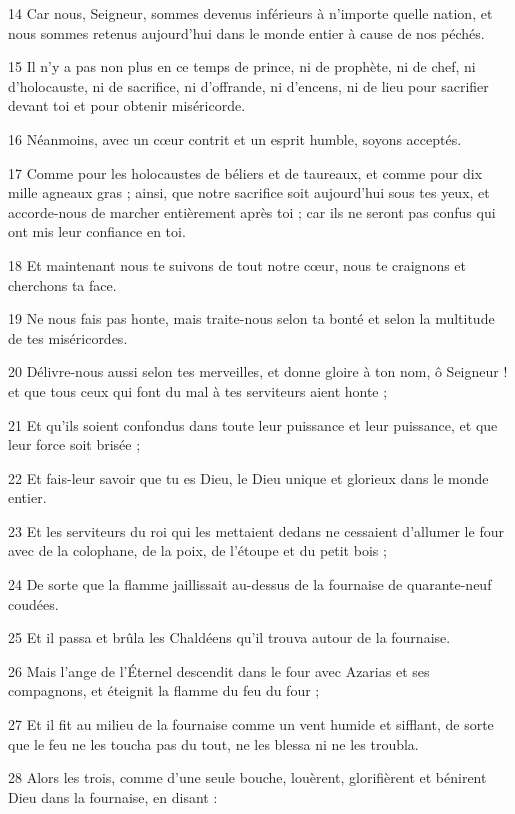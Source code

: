 \par 14 Car nous, Seigneur, sommes devenus inférieurs à n'importe quelle nation, et nous sommes retenus aujourd'hui dans le monde entier à cause de nos péchés.
\par 15 Il n'y a pas non plus en ce temps de prince, ni de prophète, ni de chef, ni d'holocauste, ni de sacrifice, ni d'offrande, ni d'encens, ni de lieu pour sacrifier devant toi et pour obtenir miséricorde.
\par 16 Néanmoins, avec un cœur contrit et un esprit humble, soyons acceptés.
\par 17 Comme pour les holocaustes de béliers et de taureaux, et comme pour dix mille agneaux gras ; ainsi, que notre sacrifice soit aujourd'hui sous tes yeux, et accorde-nous de marcher entièrement après toi ; car ils ne seront pas confus qui ont mis leur confiance en toi.
\par 18 Et maintenant nous te suivons de tout notre cœur, nous te craignons et cherchons ta face.
\par 19 Ne nous fais pas honte, mais traite-nous selon ta bonté et selon la multitude de tes miséricordes.
\par 20 Délivre-nous aussi selon tes merveilles, et donne gloire à ton nom, ô Seigneur ! et que tous ceux qui font du mal à tes serviteurs aient honte ;
\par 21 Et qu'ils soient confondus dans toute leur puissance et leur puissance, et que leur force soit brisée ;
\par 22 Et fais-leur savoir que tu es Dieu, le Dieu unique et glorieux dans le monde entier.
\par 23 Et les serviteurs du roi qui les mettaient dedans ne cessaient d'allumer le four avec de la colophane, de la poix, de l'étoupe et du petit bois ;
\par 24 De sorte que la flamme jaillissait au-dessus de la fournaise de quarante-neuf coudées.
\par 25 Et il passa et brûla les Chaldéens qu'il trouva autour de la fournaise.
\par 26 Mais l'ange de l'Éternel descendit dans le four avec Azarias et ses compagnons, et éteignit la flamme du feu du four ;
\par 27 Et il fit au milieu de la fournaise comme un vent humide et sifflant, de sorte que le feu ne les toucha pas du tout, ne les blessa ni ne les troubla.
\par 28 Alors les trois, comme d'une seule bouche, louèrent, glorifièrent et bénirent Dieu dans la fournaise, en disant :
